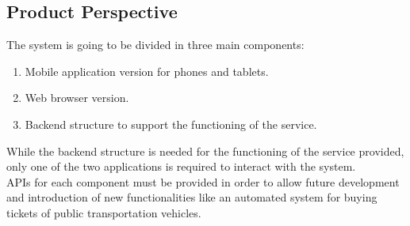 \subsection{Product Perspective}
The system is going to be divided in three main components:
\begin{enumerate}
\item Mobile application version for phones and tablets.
\item Web browser version.
\item Backend structure to support the functioning of the service.
\end{enumerate}
While the backend structure is needed for the functioning of the service provided, only one of the two applications is required to interact with the system.\\
APIs for each component must be provided in order to allow future development and introduction of new functionalities like an automated system for buying tickets of public transportation vehicles.
